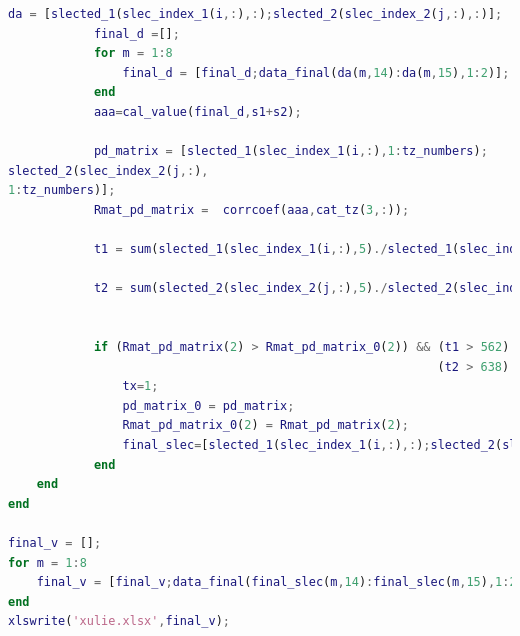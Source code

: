 \documentclass[bwprint]{gmcmthesis}
\begin{document}
\begin{lstlisting}[language=Matlab]
            da = [slected_1(slec_index_1(i,:),:);slected_2(slec_index_2(j,:),:)];
            final_d =[];
            for m = 1:8
                final_d = [final_d;data_final(da(m,14):da(m,15),1:2)];
            end
            aaa=cal_value(final_d,s1+s2);
 
            pd_matrix = [slected_1(slec_index_1(i,:),1:tz_numbers);
slected_2(slec_index_2(j,:),
1:tz_numbers)];
            Rmat_pd_matrix =  corrcoef(aaa,cat_tz(3,:));
            
            t1 = sum(slected_1(slec_index_1(i,:),5)./slected_1(slec_index_1(i,:),10)) ;
                
            t2 = sum(slected_2(slec_index_2(j,:),5)./slected_2(slec_index_2(j,:),10)) ;
            
            
            if (Rmat_pd_matrix(2) > Rmat_pd_matrix_0(2)) && (t1 > 562) && (t1 < 608) &&...
                                                            (t2 > 638) && (t2 < 692)
                tx=1;
                pd_matrix_0 = pd_matrix;
                Rmat_pd_matrix_0(2) = Rmat_pd_matrix(2);
                final_slec=[slected_1(slec_index_1(i,:),:);slected_2(slec_index_2(j,:),:)];
            end
    end
end
 
final_v = [];
for m = 1:8
    final_v = [final_v;data_final(final_slec(m,14):final_slec(m,15),1:2)];
end
xlswrite('xulie.xlsx',final_v);

 \end{lstlisting}
\end{document}
